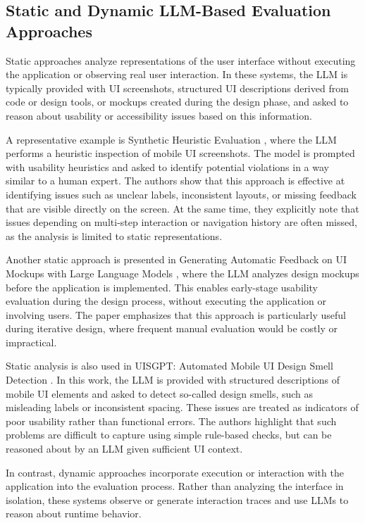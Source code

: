 \documentclass[acmsmall,nonacm]{acmart}
\begin{document}
\subsection{Static and Dynamic LLM-Based Evaluation Approaches}

Static approaches analyze representations of the user interface without executing the application or observing real user interaction. In these systems, the LLM is typically provided with UI screenshots, structured UI descriptions derived from code or design tools, or mockups created during the design phase, and asked to reason about usability or accessibility issues based on this information.

A representative example is Synthetic Heuristic Evaluation \cite{zhong2023synthetic_heuristic}, where the LLM performs a heuristic inspection of mobile UI screenshots. The model is prompted with usability heuristics and asked to identify potential violations in a way similar to a human expert. The authors show that this approach is effective at identifying issues such as unclear labels, inconsistent layouts, or missing feedback that are visible directly on the screen. At the same time, they explicitly note that issues depending on multi-step interaction or navigation history are often missed, as the analysis is limited to static representations.

Another static approach is presented in Generating Automatic Feedback on UI Mockups with Large Language Models \cite{duan2024ui_mockup_feedback}, where the LLM analyzes design mockups before the application is implemented. This enables early-stage usability evaluation during the design process, without executing the application or involving users. The paper emphasizes that this approach is particularly useful during iterative design, where frequent manual evaluation would be costly or impractical.

Static analysis is also used in UISGPT: Automated Mobile UI Design Smell Detection \cite{yang2023uisgpt}. In this work, the LLM is provided with structured descriptions of mobile UI elements and asked to detect so-called design smells, such as misleading labels or inconsistent spacing. These issues are treated as indicators of poor usability rather than functional errors. The authors highlight that such problems are difficult to capture using simple rule-based checks, but can be reasoned about by an LLM given sufficient UI context.

In contrast, dynamic approaches incorporate execution or interaction with the application into the evaluation process. Rather than analyzing the interface in isolation, these systems observe or generate interaction traces and use LLMs to reason about runtime behavior.
\end{document}

